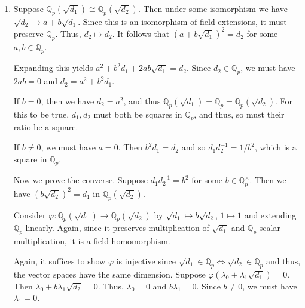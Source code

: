 \documentclass[12 pt, letterpaper]{hmcpset}
\begin{document}
\begin{solution}
\begin{enumerate}
			Consider $\varphi : \mathbb{Q}_{p}(\sqrt{d}) \to \mathbb{Q}_{p}(\alpha)$ by $\sqrt{d} \mapsto \alpha + a_{1} / 2$, $1 \mapsto 1$ and extending $\mathbb{Q}_{p}$-linearly. Since $(\alpha + a_{1} / 2)^{2} = d$ and there are no other relations in $\mathbb{Q}_{p}(\sqrt{d})$, this is a field homomorphism. We now show that it is an injection of same-dimensional vector spaces, and thus, an isomorphism. 

			Suppose $\varphi(\lambda_{0} + \lambda_{1} \sqrt{d}) = 0$. That is,
			\[
				\lambda_{0} + \lambda_{1} a_{1}/2 + \lambda_{1} \alpha = 0.
			\]
			Since $1, \alpha$ are linearly independent, this forces $\lambda_{1} = 0$ and $\lambda_{0} + \lambda_{1} a_{1} / 2 = 0$. Thus, $\lambda_{0} = - \lambda_{1} a_{1} / 2 = 0$ as well. That is, $\varphi(\lambda_{0} + \lambda_{1} \sqrt{d})$ only if $\lambda_{0} = \lambda_{1} = 0$. Thus, $\varphi$ is an injection.

		\item Suppose $\mathbb{Q}_{p}(\sqrt{d_{1}}) \cong \mathbb{Q}_{p}(\sqrt{d_{2}})$. Then under some isomorphism we have $\sqrt{d_{2}} \mapsto a + b \sqrt{d_{1}}$. Since this is an isomorphism of field extensions, it must preserve $\mathbb{Q}_{p}$. Thus, $d_{2} \mapsto d_{2}$. It follows that $(a + b \sqrt{d_{1}})^{2} = d_{2}$ for some $a, b \in \mathbb{Q}_{p}$.

			Expanding this yields $a^{2} + b^{2} d_{1} + 2 a b \sqrt{d_{1}} = d_{2}$. Since $d_{2} \in \mathbb{Q}_{p}$, we must have $2 ab = 0$ and $d_{2} = a^{2} + b^{2} d_{1}$. 

			If $b = 0$, then we have $d_{2} = a^{2}$, and thus $\mathbb{Q}_{p}(\sqrt{d_{1}}) = \mathbb{Q}_{p} = \mathbb{Q}_{p}(\sqrt{d_{2}})$. For this to be true, $d_{1}, d_{2}$ must both be squares in $\mathbb{Q}_{p}$, and thus, so must their ratio be a square. 

			If $b \neq 0$, we must have $a = 0$. Then $b^{2} d_{1} = d_{2}$ and so $d_{1} d_{2}^{-1} = 1 / b^{2}$, which is a square in $\mathbb{Q}_{p}$.

			Now we prove the converse. Suppose $d_{1} d_{2}^{-1} = b^{2}$ for some $b \in \mathbb{Q}_{p}^{\times}$. Then we have $(b \sqrt{d_{2}})^{2} = d_{1}$ in $\mathbb{Q}_{p}(\sqrt{d_{2}})$.

			Consider $\varphi : \mathbb{Q}_{p}(\sqrt{d_{1}}) \to \mathbb{Q}_{p}(\sqrt{d_{2}})$ by $\sqrt{d_{1}} \mapsto b \sqrt{d_{2}}$, $1 \mapsto 1$ and extending $\mathbb{Q}_{p}$-linearly. Again, since it preserves multiplication of $\sqrt{d_{1}}$ and $\mathbb{Q}_{p}$-scalar multiplication, it is a field homomorphism.

			Again, it suffices to show $\varphi$ is injective since $\sqrt{d_{1}} \in \mathbb{Q}_{p} \iff \sqrt{d_{2}} \in \mathbb{Q}_{p}$ and thus, the vector spaces have the same dimension. Suppose $\varphi(\lambda_{0} + \lambda_{1} \sqrt{d_{1}}) = 0$. Then $\lambda_{0} + b \lambda_{1} \sqrt{d_{2}} = 0$. Thus, $\lambda_{0} = 0$ and $b \lambda_{1} = 0$. Since $b \neq 0$, we must have $\lambda_{1} = 0$.
	\end{enumerate}
\end{solution}
\end{document}
